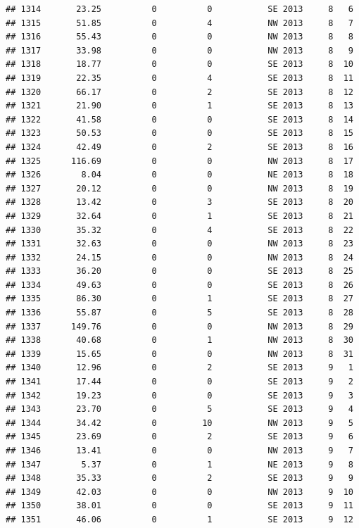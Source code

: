 \documentclass[
]{article}
\begin{document}
\begin{verbatim}
## 1314       23.25          0          0           SE 2013     8   6
## 1315       51.85          0          4           NW 2013     8   7
## 1316       55.43          0          0           NW 2013     8   8
## 1317       33.98          0          0           NW 2013     8   9
## 1318       18.77          0          0           SE 2013     8  10
## 1319       22.35          0          4           SE 2013     8  11
## 1320       66.17          0          2           SE 2013     8  12
## 1321       21.90          0          1           SE 2013     8  13
## 1322       41.58          0          0           SE 2013     8  14
## 1323       50.53          0          0           SE 2013     8  15
## 1324       42.49          0          2           SE 2013     8  16
## 1325      116.69          0          0           NW 2013     8  17
## 1326        8.04          0          0           NE 2013     8  18
## 1327       20.12          0          0           NW 2013     8  19
## 1328       13.42          0          3           SE 2013     8  20
## 1329       32.64          0          1           SE 2013     8  21
## 1330       35.32          0          4           SE 2013     8  22
## 1331       32.63          0          0           NW 2013     8  23
## 1332       24.15          0          0           NW 2013     8  24
## 1333       36.20          0          0           SE 2013     8  25
## 1334       49.63          0          0           SE 2013     8  26
## 1335       86.30          0          1           SE 2013     8  27
## 1336       55.87          0          5           SE 2013     8  28
## 1337      149.76          0          0           NW 2013     8  29
## 1338       40.68          0          1           NW 2013     8  30
## 1339       15.65          0          0           NW 2013     8  31
## 1340       12.96          0          2           SE 2013     9   1
## 1341       17.44          0          0           SE 2013     9   2
## 1342       19.23          0          0           SE 2013     9   3
## 1343       23.70          0          5           SE 2013     9   4
## 1344       34.42          0         10           NW 2013     9   5
## 1345       23.69          0          2           SE 2013     9   6
## 1346       13.41          0          0           NW 2013     9   7
## 1347        5.37          0          1           NE 2013     9   8
## 1348       35.33          0          2           SE 2013     9   9
## 1349       42.03          0          0           NW 2013     9  10
## 1350       38.01          0          0           SE 2013     9  11
## 1351       46.06          0          1           SE 2013     9  12

\end{verbatim}
\end{document}
